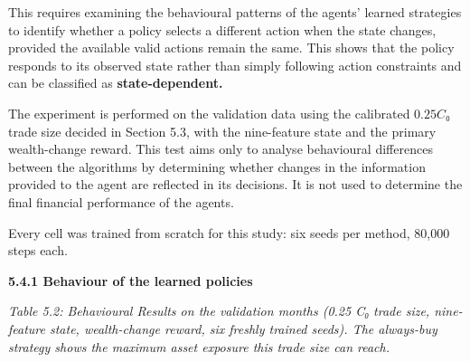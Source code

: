 This requires examining the behavioural patterns of the agents' learned
strategies to identify whether a policy selects a different action when
the state changes, provided the available valid actions remain the same.
This shows that the policy responds to its observed state rather than
simply following action constraints and can be classified as
\textbf{state-dependent.}

The experiment is performed on the validation data using the calibrated
\(0.25C₀\) trade size decided in Section 5.3, with the nine-feature
state and the primary wealth-change reward. This test aims only to
analyse behavioural differences between the algorithms by determining
whether changes in the information provided to the agent are reflected
in its decisions. It is not used to determine the final financial
performance of the agents.

Every cell was trained from scratch for this study: six seeds per
method, 80,000 steps each.

\textbf{5.4.1 Behaviour of the learned policies}

\emph{Table 5.2: Behavioural Results on the validation months (0.25 C₀
trade size, nine-feature state, wealth-change reward, six freshly
trained seeds). The always-buy strategy shows the maximum asset exposure
this trade size can reach.}

